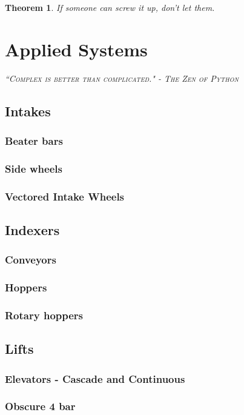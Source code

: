 \documentclass[10pt,letterpaper]{book}
\newtheorem{theorem}{Theorem}
\begin{document}
\begin{theorem}
If someone can screw it up, don't let them.
\end{theorem}

\chapter{Applied Systems}

 {\slshape \scshape ``Complex is better than complicated." - The Zen of Python}
 \\

\section{Intakes}
\subsection{Beater bars}
\subsection{Side wheels}
\subsection{Vectored Intake Wheels}

\section{Indexers}
\subsection{Conveyors}
\subsection{Hoppers}
\subsection{Rotary hoppers}

\section{Lifts}
\subsection{Elevators - Cascade and Continuous}
\subsection{Obscure 4 bar}
\end{document}
